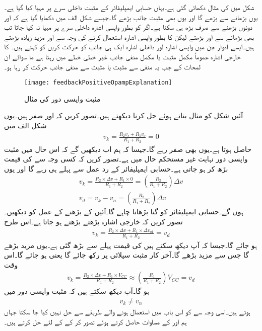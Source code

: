 شکل  میں   کی مثال دکھائی گئی ہے۔یہاں  حسابی ایمپلیفائر کے مثبت داخلی سرے  پر مہیا کیا گیا ہے۔یوں  بڑھانے سے  بڑھے گا اور یوں  بھی مثبت جانب بڑھے گا۔جیسے شکل  الف     میں دکھایا گیا ہے کہ  اور  دونوں بڑھنے سے  صرف بڑھ ہی سکتا ہے۔اگر  کو بطور واپسی اشارہ داخلی سرے  پر مہیا نہ کیا جاتا تب بھی  بڑھانے سے   اور بڑھتے لیکن  کا بطور واپسی اشارہ استعمال کرنے کی وجہ سے    اور   مزید زیادہ بڑھتے ہیں۔ایسے ادوار جن میں واپسی اشارہ اور داخلی اشارہ ایک ہی جانب کو حرکت کریں کو  کہتے ہیں۔  کا خارجی اشارہ  عموماً مکمل مثبت یا مکمل منفی جانب غیر خطی خطے میں رہتا ہے ما سوائے ان لمحات کے جب یہ منفی سے مثبت یا مثبت سے منفی جانب حرکت کر رہا ہو۔
\begin{figure}
\centering
\texttt{[image: feedbackPositiveOpampExplanation]}
\caption{مثبت واپسی دور کی مثال}
\label{شکل_حسابی_مثبت_واپسی_دور}
\end{figure}
آئیں شکل  کو مثال بناتے ہوئے  حل کرنا دیکھتے ہیں۔تصور کریں کہ  اور  صفر ہیں۔یوں شکل  الف     میں 
\begin{align*}
v_k=\frac{R_2 v_s+R_1 v_o}{R_1+R_2}=0
\end{align*}
حاصل ہوتا ہے۔یوں  بھی صفر رہے گا۔جیسا کہ ہم اب دیکھیں گے کہ اس حال میں مثبت واپسی دور نہایت غیر مستحکم حال میں ہے۔تصور کریں کہ کسی وجہ سے  کی قیمت بڑھ کر  ہو جاتی ہے۔حسابی ایمپلیفائر کے رد عمل سے پہلے  ہی رہے گا اور یوں
\begin{align*}
v_k=\frac{R_2 \times \Delta v+R_1 \times  0}{R_1+R_2}=\left(\frac{R_2}{R_1+R_2}\right) \Delta v \\
v_d=v_k-v_n=\left(\frac{R_2}{R_1+R_2}\right) \Delta v 
\end{align*}
ہوں گے۔حسابی ایمپلیفائر  کو  گنا بڑھانا چاہے گا۔آئیں  کے بڑھنے کے عمل کو دیکھیں۔تصور کریں کہ خارجی اشارہ  بڑھتے بڑھتے  ہو جاتا ہے۔اس طرح 
\begin{align*}
v_k=\frac{R_2 \times \Delta v+R_1 \times  \Delta v_{o1}}{R_1+R_2}=v_d
\end{align*}
ہو جائے گا۔جیسا کہ آپ دیکھ سکتے ہیں  کی قیمت پہلے سے بڑھ گئی ہے۔یوں  مزید بڑھے گا جس سے  مزید بڑھے گا۔آخر کار  مثبت سپلائی پر رکھ جائے گا یعنی  ہو جائے گا۔اس وقت
\begin{align*}
v_k=\frac{R_2 \times \Delta v+R_1 \times  V_{CC}}{R_1+R_2} \approx \left(\frac{R_1}{R_1+R_2} \right) V_{CC}=v_d
\end{align*}
ہو گا۔آپ دیکھ سکتے ہیں کہ مثبت واپسی دور میں 
\begin{align}
v_k \ne v_n
\end{align}
ہوتے ہیں۔اسی وجہ سے  کو اس باب میں استعمال ہونے والے طریقے سے حل نہیں کیا جا سکتا جہاں ہم  اور  کے مساوات حاصل کرتے ہوئے   تصور کر کے  کے لئے حل کرتے ہیں۔

